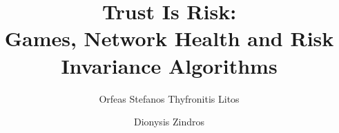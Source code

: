 \title{Trust Is Risk: \\ Games, Network Health and Risk Invariance Algorithms}
\author{Orfeas Stefanos Thyfronitis Litos
        \and Dionysis Zindros}
\maketitle
